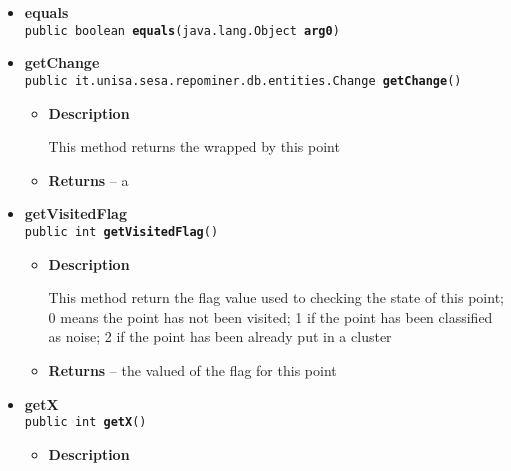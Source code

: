 {{{{{{\begin{itemize}
{\begin{itemize}
{Calculate distance between two ChangePoints
}
\item{
{\bf  Parameters}
  \begin{itemize}
   \item{
\texttt{pChangePoint} -- the point used to calculate distance from this point}
  \end{itemize}
}%
\item{{\bf  Returns} -- 
A double value that represent distance between two points 
}%
\end{itemize}
}%
\item{ 
\hypertarget{it.unisa.sesa.repominer.dbscan.ChangePoint.equals(java.lang.Object)}{{\bf  equals}\\}
\texttt{public boolean\ {\bf  equals}(\texttt{java.lang.Object} {\bf  arg0})
\label{it.unisa.sesa.repominer.dbscan.ChangePoint.equals(java.lang.Object)}}%
}%
\item{ 
\hypertarget{it.unisa.sesa.repominer.dbscan.ChangePoint.getChange()}{{\bf  getChange}\\}
\texttt{public it.unisa.sesa.repominer.db.entities.Change\ {\bf  getChange}()
\label{it.unisa.sesa.repominer.dbscan.ChangePoint.getChange()}}%
\begin{itemize}
\item{
{\bf  Description}

This method returns the \hyperlink{it.unisa.sesa.repominer.db.entities.Change}{}{\small 
{}} wrapped by this point
}
\item{{\bf  Returns} -- 
a \hyperlink{it.unisa.sesa.repominer.db.entities.Change}{}{\small 
{}} 
}%
\end{itemize}
}%
\item{ 
\hypertarget{it.unisa.sesa.repominer.dbscan.ChangePoint.getVisitedFlag()}{{\bf  getVisitedFlag}\\}
\texttt{public int\ {\bf  getVisitedFlag}()
\label{it.unisa.sesa.repominer.dbscan.ChangePoint.getVisitedFlag()}}%
\begin{itemize}
\item{
{\bf  Description}

This method return the flag value used to checking the state of this point; 0 means the point has not been visited; 1 if the point has been classified as noise; 2 if the point has been already put in a cluster
}
\item{{\bf  Returns} -- 
the valued of the flag for this point 
}%
\end{itemize}
}%
\item{ 
\hypertarget{it.unisa.sesa.repominer.dbscan.ChangePoint.getX()}{{\bf  getX}\\}
\texttt{public int\ {\bf  getX}()
\label{it.unisa.sesa.repominer.dbscan.ChangePoint.getX()}}%
\begin{itemize}
\item{
{\bf  Description}

}
\end{itemize}}
\end{itemize}}}}}}}

